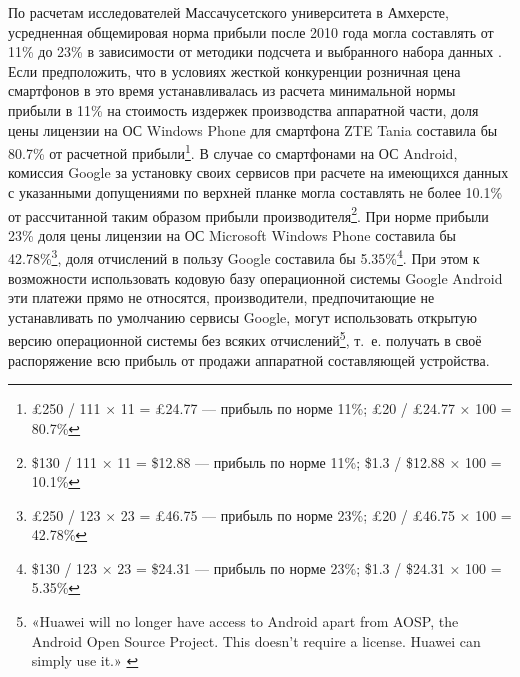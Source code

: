 \documentclass{article}
\begin{document}
По расчетам исследователей Массачусетского университета в Амхерсте, усредненная общемировая норма прибыли после 2010 года могла составлять от 11\% до 23\% в зависимости от методики подсчета и выбранного набора данных \cite{worldProfitRates}. Если предположить, что в условиях жесткой конкуренции розничная цена смартфонов в это время устанавливалась из расчета минимальной нормы прибыли в 11\% на стоимость издержек производства аппаратной части, доля цены лицензии на ОС Windows Phone для смартфона ZTE Tania составила бы 80.7\% от расчетной прибыли\footnote{£250 / 111 × 11 = £24.77 — прибыль по норме 11\%; £20 / £24.77 × 100 = 80.7\%}. В случае со смартфонами на ОС Android, комиссия Google за установку своих сервисов при расчете на имеющихся данных с указанными допущениями по верхней планке могла составлять не более 10.1\% от рассчитанной таким образом прибыли производителя\footnote{\$130 / 111 × 11 = \$12.88 — прибыль по норме 11\%; \$1.3 / \$12.88 × 100 = 10.1\%}. При норме прибыли 23\% доля цены лицензии на ОС Microsoft Windows Phone составила бы 42.78\%\footnote{£250 / 123 × 23 = £46.75 — прибыль по норме 23\%; £20 / £46.75 × 100 = 42.78\%}, доля отчислений в пользу Google составила бы 5.35\%\footnote{\$130 / 123 × 23 = \$24.31 — прибыль по норме 23\%; \$1.3 / \$24.31 × 100 = 5.35\%}. При этом к возможности использовать кодовую базу операционной системы Google Android эти платежи прямо не относятся, производители, предпочитающие не устанавливать по умолчанию сервисы Google, могут использовать открытую версию операционной системы без всяких отчислений\footnote{«Huawei will no longer have access to Android apart from AOSP, the Android Open Source Project. This doesn’t require a license. Huawei can simply use it.» \cite{androidHuaweiBan2019}}, т.~е. получать в своё распоряжение всю прибыль от продажи аппаратной составляющей устройства.
\end{document}
